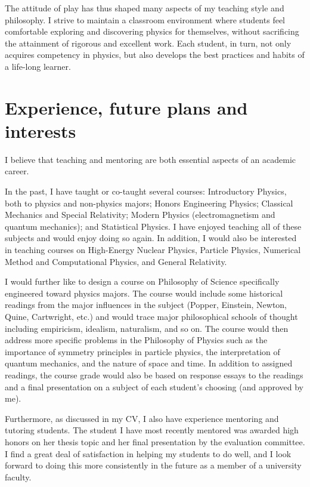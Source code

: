 \documentclass[12pt, tightenlines, onecolumn, showpacs, amsfonts, aps, prc, nofootinbib, floatfix]{revtex4-2}
\begin{document}
\medskip

The attitude of play has thus shaped many aspects of my teaching style and philosophy.  I strive to maintain a classroom environment where students feel comfortable exploring and discovering physics for themselves, without sacrificing the attainment of rigorous and excellent work.  Each student, in turn, not only acquires competency in physics, but also develops the best practices and habits of a life-long learner.

\newpage

\section*{Experience, future plans and interests}

I believe that teaching and mentoring are both essential aspects of an academic career.

\medskip

In the past, I have taught or co-taught several courses: Introductory Physics, both to physics and non-physics majors; Honors Engineering Physics; Classical Mechanics and Special Relativity; Modern Physics (electromagnetism and quantum mechanics); and Statistical Physics.  I have enjoyed teaching all of these subjects and would enjoy doing so again.  In addition, I would also be interested in teaching courses on High-Energy Nuclear Physics, Particle Physics, Numerical Method and Computational Physics, and General Relativity.

\medskip

I would further like to design a course on Philosophy of Science specifically engineered toward physics majors.  The course would include some historical readings from the major influences in the subject (Popper, Einstein, Newton, Quine, Cartwright, etc.) and would trace major philosophical schools of thought including empiricism, idealism, naturalism, and so on.  The course would then address more specific problems in the Philosophy of Physics such as the importance of symmetry principles in particle physics, the interpretation of quantum mechanics, and the nature of space and time.  In addition to assigned readings, the course grade would also be based on response essays to the readings and a final presentation on a subject of each student's choosing (and approved by me).

\medskip 

Furthermore, as discussed in my CV, I also have experience mentoring and tutoring students.  The student I have most recently mentored was awarded high honors on her thesis topic and her final presentation by the evaluation committee.  I find a great deal of satisfaction in helping my students to do well, and I look forward to doing this more consistently in the future as a member of a university faculty.
\end{document}
